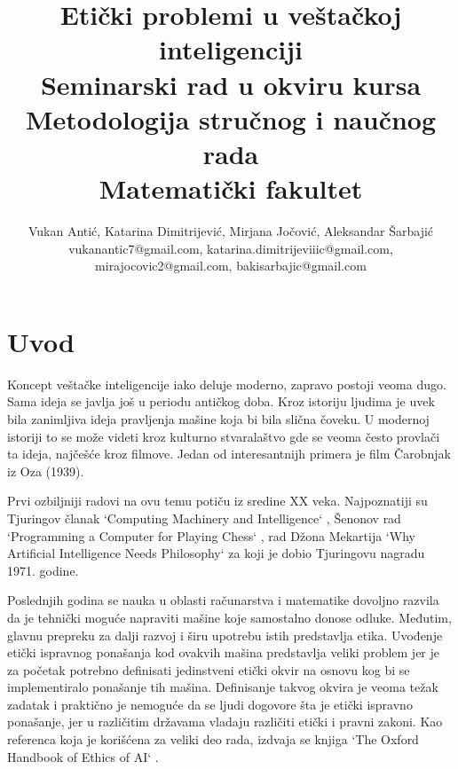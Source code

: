 \documentclass[a4paper]{article}
\begin{document}
\title{Etički problemi u veštačkoj inteligenciji\\ \small{Seminarski rad u okviru kursa\\Metodologija stručnog i naučnog rada\\ Matematički fakultet}}

\author{Vukan Antić, Katarina Dimitrijević, Mirjana Jočović, Aleksandar Šarbajić \\ vukanantic7@gmail.com, katarina.dimitrijeviiic@gmail.com, \\ mirajocovic2@gmail.com, bakisarbajic@gmail.com}


\maketitle


\tableofcontents

\newpage

\section{Uvod}
\label{sec:uvod}


Koncept veštačke inteligencije iako deluje moderno, zapravo postoji veoma dugo. \cite{introduction} Sama ideja se javlja još u periodu antičkog doba. Kroz istoriju ljudima je uvek bila zanimljiva ideja pravljenja mašine koja bi bila slična čoveku. U modernoj istoriji to se može videti kroz kulturno stvaralaštvo gde se veoma često provlači ta ideja, najčešće kroz filmove. Jedan od interesantnijh primera je film Čarobnjak iz Oza (1939).

Prvi ozbiljniji radovi na ovu temu potiču iz sredine XX veka. Najpoznatiji su Tjuringov članak `Computing Machinery and Intelligence` \cite{turing_compting}, Šenonov rad `Programming a Computer for Playing Chess` \cite{senon_sah}, rad Džona Mekartija `Why Artificial Intelligence Needs Philosophy` \cite{mekarti} za koji je dobio Tjuringovu nagradu 1971. godine. 

Poslednjih godina se nauka u oblasti računarstva i matematike dovoljno razvila da je tehnički moguće napraviti mašine koje samostalno donose odluke. Međutim, glavnu prepreku za dalji razvoj i širu upotrebu istih predstavlja etika. Uvođenje etički ispravnog ponašanja kod ovakvih mašina predstavlja veliki problem jer je za početak potrebno definisati jedinstveni etički okvir na osnovu kog bi se implementiralo ponašanje tih mašina. Definisanje takvog okvira je veoma težak zadatak i praktično je nemoguće da se ljudi dogovore šta je etički ispravno ponašanje, jer u različitim državama vladaju različiti etički i pravni zakoni. Kao referenca koja je korišćena za veliki deo rada, izdvaja se knjiga `The Oxford Handbook of Ethics of AI` \cite{oxford_knjiga}.
\end{document}

